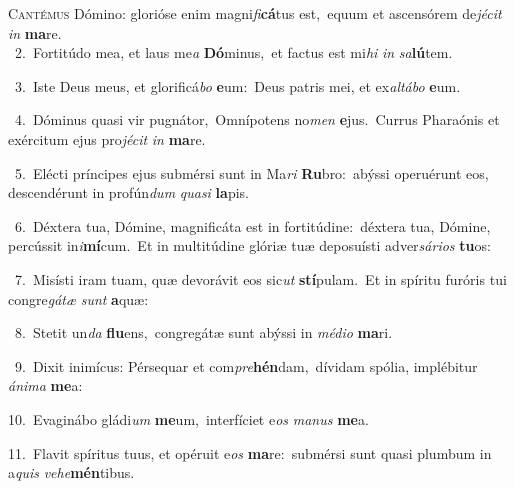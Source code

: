 \lettrine{\initial\textcolor{\initialcolor}{C}}{antémus} Dómino: glorióse enim magni\-\textit{fi}\-\textbf{cá}tus est,~\star equum et ascensórem de\-\textit{jé}\-\textit{cit} \textit{in} \textbf{ma}\-re.\\
{\numbfont\textcolor{\numbcolor}{~2.}}~Fortitúdo mea, et laus me\textit{a} \textbf{Dó}\-minus,~\star et factus est mi\textit{hi} \textit{in} \textit{sa}\-\textbf{lú}tem.\par
{\numbfont\textcolor{\numbcolor}{~3.}}~Iste Deus meus, et glorificá\textit{bo} \textbf{e}\-um:~\star Deus patris mei, et ex\-\textit{al}\-\textit{tá}\textit{bo} \textbf{e}\-um.\par
{\numbfont\textcolor{\numbcolor}{~4.}}~Dóminus quasi vir pugnátor,~\dagger Omnípotens no\textit{men} \textbf{e}\-jus.~\star Currus Pharaónis et exércitum ejus pro\-\textit{jé}\-\textit{cit} \textit{in} \textbf{ma}\-re.\par
{\numbfont\textcolor{\numbcolor}{~5.}}~Elécti príncipes ejus submérsi sunt in Ma\textit{ri} \textbf{Ru}\-bro:~\star abýssi operuérunt eos, descendérunt in profún\textit{dum} \textit{qua}\-\textit{si} \textbf{la}\-pis.\par
{\numbfont\textcolor{\numbcolor}{~6.}}~Déxtera tua, Dómine, magnificáta est in fortitúdine:~\dagger déxtera tua, Dómine, percússit in\-\textit{i}\-\textbf{mí}cum.~\star Et in multitúdine glóriæ tuæ deposuísti adver\-\textit{sá}\-\textit{ri}\textit{os} \textbf{tu}\-os:\par
{\numbfont\textcolor{\numbcolor}{~7.}}~Misísti iram tuam, quæ devorávit eos sic\textit{ut} \textbf{stí}\-pulam.~\star Et in spíritu furóris tui congre\-\textit{gá}\-\textit{tæ} \textit{sunt} \textbf{a}\-quæ:\par
{\numbfont\textcolor{\numbcolor}{~8.}}~Stetit un\textit{da} \textbf{flu}\-ens,~\star congregátæ sunt abýssi in \textit{mé}\-\textit{di}\textit{o} \textbf{ma}\-ri.\par
{\numbfont\textcolor{\numbcolor}{~9.}}~Dixit inimícus: Pérsequar et com\-\textit{pre}\-\textbf{hén}dam,~\star dívidam spólia, implébitur \textit{á}\-\textit{ni}\textit{ma} \textbf{me}\-a:\par
{\numbfont\textcolor{\numbcolor}{10.}}~Evaginábo gládi\textit{um} \textbf{me}\-um,~\star interfíciet e\textit{os} \textit{ma}\-\textit{nus} \textbf{me}\-a.\par
{\numbfont\textcolor{\numbcolor}{11.}}~Flavit spíritus tuus, et opéruit e\textit{os} \textbf{ma}\-re:~\star submérsi sunt quasi plumbum in a\textit{quis} \textit{ve}\-\textit{he}\textbf{mén}tibus.\par
